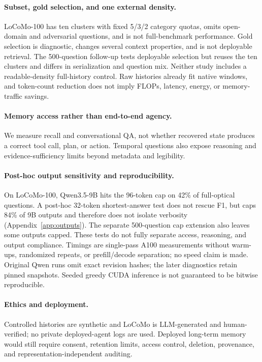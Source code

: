 \documentclass{article}
\begin{document}
\paragraph{Subset, gold selection, and one external density.}
LoCoMo-100 has ten clusters with fixed 5/3/2 category quotas, omits open-domain and adversarial questions, and is not full-benchmark performance. Gold selection is diagnostic, changes several context properties, and is not deployable retrieval. The 500-question follow-up tests deployable selection but reuses the ten clusters and differs in serialization and question mix. Neither study includes a readable-density full-history control. Raw histories already fit native windows, and token-count reduction does not imply FLOPs, latency, energy, or memory-traffic savings.

\paragraph{Memory access rather than end-to-end agency.}
We measure recall and conversational QA, not whether recovered state produces a correct tool call, plan, or action. Temporal questions also expose reasoning and evidence-sufficiency limits beyond metadata and legibility.

\paragraph{Post-hoc output sensitivity and reproducibility.}
On LoCoMo-100, Qwen3.5-9B hits the 96-token cap on 42\% of full-optical questions. A post-hoc 32-token shortest-answer test does not rescue F1, but caps 84\% of 9B outputs and therefore does not isolate verbosity (Appendix~\ref{app:outputs}). The separate 500-question cap extension also leaves some outputs capped. These tests do not fully separate access, reasoning, and output compliance. Timings are single-pass A100 measurements without warm-ups, randomized repeats, or prefill/decode separation; no speed claim is made. Original Qwen runs omit exact revision hashes; the later diagnostics retain pinned snapshots. Seeded greedy CUDA inference is not guaranteed to be bitwise reproducible.

\paragraph{Ethics and deployment.}
Controlled histories are synthetic and LoCoMo is LLM-generated and human-verified; no private deployed-agent logs are used. Deployed long-term memory would still require consent, retention limits, access control, deletion, provenance, and representation-independent auditing.
\end{document}
